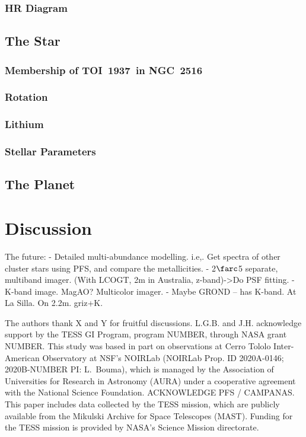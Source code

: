 \documentclass[12pt,twocolumn,tighten]{aastex63}
\newcommand{\tn}{TOI~1937} %
\newcommand{\cn}{NGC~2516} %
\begin{document}
\subsubsection{HR Diagram}
\label{subsec:hr}

\subsection{The Star}
\label{subsec:star}

\subsubsection{Membership of \tn\ in \cn}
\label{subsec:member}

\subsubsection{Rotation}

\subsubsection{Lithium}

\subsubsection{Stellar Parameters}
\label{subsec:starparams}

\subsection{The Planet}
\label{subsec:planet}


\section{Discussion}
\label{sec:discussion}

The future:
- Detailed multi-abundance modelling.
  i.e,. Get spectra of other cluster stars using PFS, and compare the metallicities.
- 2$\farc$5 separate, multiband imager. (With LCOGT, 2m in Australia,
  z-band)->Do PSF fitting.
- K-band image. MagAO? Multicolor imager.
- Maybe GROND -- has K-band. At La Silla. On 2.2m.  griz+K.




\acknowledgements
\raggedbottom

The authors thank X and Y for fruitful discussions.
%
L.G.B. and J.H. acknowledge support by the TESS GI Program, program
NUMBER, through NASA grant NUMBER.
%
This study was based in part on observations at Cerro Tololo
Inter-American Observatory at NSF's NOIRLab (NOIRLab Prop. ID
2020A-0146; 2020B-NUMBER PI: L{.}~Bouma), which is managed by the
Association of Universities for Research in Astronomy (AURA) under a
cooperative agreement with the National Science Foundation.
%
ACKNOWLEDGE PFS / CAMPANAS.
%
This paper includes data collected by the TESS mission, which are
publicly available from the Mikulski Archive for Space Telescopes
(MAST).
%
Funding for the TESS mission is provided by NASA's Science Mission
directorate.
%
\end{document}

